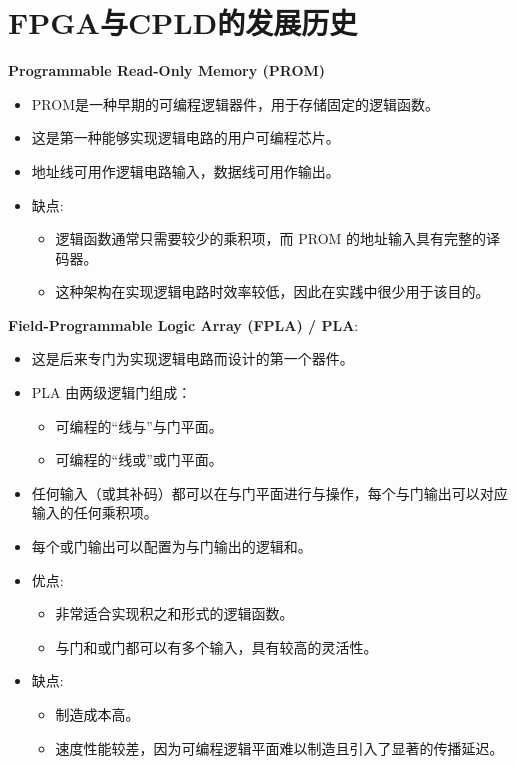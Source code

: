 \section{FPGA与CPLD的发展历史}

\begin{frame}{\textbf{Programmable Read-Only Memory (PROM)}}
\begin{itemize}
\tightlist
\item PROM是一种早期的可编程逻辑器件，用于存储固定的逻辑函数。
\item
    这是第一种能够实现逻辑电路的用户可编程芯片。
\item
    地址线可用作逻辑电路输入，数据线可用作输出。
\item
    缺点:

    \begin{itemize}
    \tightlist
    \item
    逻辑函数通常只需要较少的乘积项，而 PROM 的地址输入具有完整的译码器。
    \item
    这种架构在实现逻辑电路时效率较低，因此在实践中很少用于该目的。
    \end{itemize}
\end{itemize}
\end{frame}


\begin{frame}{\textbf{Field-Programmable Logic Array (FPLA) / PLA}:}
\begin{itemize}
\tightlist
\item
    这是后来专门为实现逻辑电路而设计的第一个器件。
\item
    PLA 由两级逻辑门组成：

    \begin{itemize}
    \tightlist
    \item
    可编程的``线与''与门平面。
    \item
    可编程的``线或''或门平面。
    \end{itemize}
\item
    任何输入（或其补码）都可以在与门平面进行与操作，每个与门输出可以对应输入的任何乘积项。
\item
    每个或门输出可以配置为与门输出的逻辑和。
\item
    优点:

    \begin{itemize}
    \tightlist
    \item
    非常适合实现积之和形式的逻辑函数。
    \item
    与门和或门都可以有多个输入，具有较高的灵活性。
    \end{itemize}
\item
    缺点:

    \begin{itemize}
    \tightlist
    \item
    制造成本高。
    \item
    速度性能较差，因为可编程逻辑平面难以制造且引入了显著的传播延迟。
    \end{itemize}
\end{itemize}
\end{frame}

